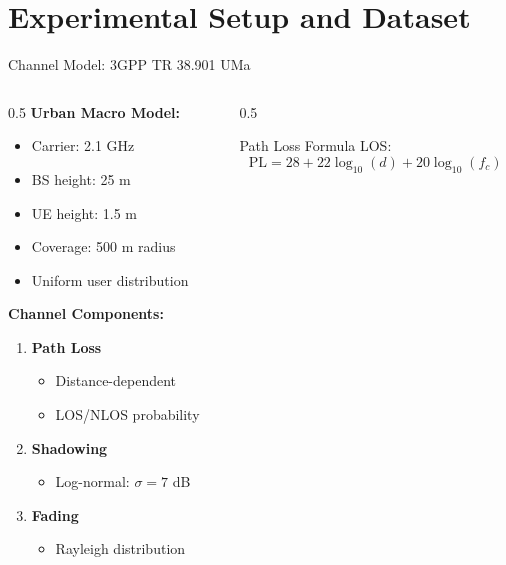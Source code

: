 \documentclass[aspectratio=169]{beamer}
\begin{document}
\section{Experimental Setup and Dataset}

\begin{frame}{Channel Model: 3GPP TR 38.901 UMa}
    \begin{columns}
        \begin{column}{0.5\textwidth}
            \textbf{Urban Macro Model:}
            \begin{itemize}
                \item Carrier: 2.1 GHz
                \item BS height: 25 m
                \item UE height: 1.5 m
                \item Coverage: 500 m radius
                \item Uniform user distribution
            \end{itemize}
            
            \vspace{0.3cm}
            
            \textbf{Channel Components:}
            \begin{enumerate}
                \item \textbf{Path Loss}
                \begin{itemize}
                    \item Distance-dependent
                    \item LOS/NLOS probability
                \end{itemize}
                
                \item \textbf{Shadowing}
                \begin{itemize}
                    \item Log-normal: $\sigma = 7$ dB
                \end{itemize}
                
                \item \textbf{Fading}
                \begin{itemize}
                    \item Rayleigh distribution
                \end{itemize}
            \end{enumerate}
        \end{column}
        \begin{column}{0.5\textwidth}
            \begin{block}{Path Loss Formula}
                \small
                LOS:
                \begin{equation*}
                    \text{PL} = 28 + 22\log_{10}(d) + 20\log_{10}(f_c)
                \end{equation*}
                

\end{block}
\end{column}
\end{columns}
\end{frame}
\end{document}
